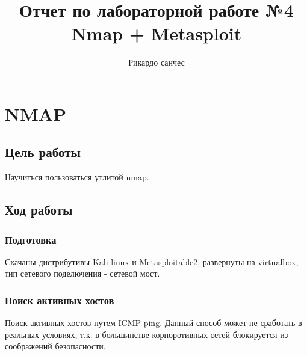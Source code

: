 \documentclass[10pt,a4paper]{article}
\author{Рикардо санчес}
\date{}
\title{Отчет по лабораторной работе №4 Nmap + Metasploit}
\begin{document}
\maketitle

\newpage

\section{NMAP}

\subsection{Цель работы}

Научиться пользоваться утлитой nmap.

\subsection{Ход работы}

\subsubsection{Подготовка}

Скачаны дистрибутивы Kali linux и Metasploitable2, развернуты на virtualbox, тип сетевого поделючения - сетевой мост.

\subsubsection{Поиск активных хостов}

Поиск активных хостов путем ICMP ping. Данный способ может не сработать в реальных условиях, т.к. в большинстве корпоротивных сетей блокируется из соображений безопасности.
\end{document}
